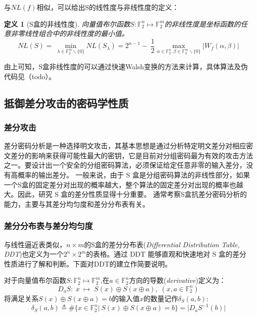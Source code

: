 \documentclass{xduugthesis}
\newtheorem{definition}{定义}
\begin{document}
与$NL(f)$相似，可以给出S的线性度与非线性度的定义：
\begin{definition}[S盒的非线性度]
    向量值布尔函数$S:\mathbb{F}_2^n \mapsto \mathbb{F}_2^m$的非线性度是坐标函数的任意非零线性组合中的非线性度的最小值。
    \begin{equation}\label{Snonlinearity}
        NL(S) = \: \mathop{min}\limits_{\lambda \in \mathbb{F}_2^m \backslash \{0\}} NL(S_{\lambda}) = 2^{n-1} - \: \frac{1}{2}\mathop{max}\limits_{\alpha \in \mathbb{F}_2^n, \beta \in \mathbb{F}_2^m \backslash \{0\}} \lvert W_f(\alpha, \beta)\rvert
    \end{equation}
\end{definition}
由上可知，S盒非线性度的可以通过快速Walsh变换\cite{sosa2016calculating}的方法来计算，具体算法及伪代码见（todo）。


\subsection{抵御差分攻击的密码学性质}
\subsubsection{差分攻击}
差分密码分析\cite{DBLP:conf/crypto/BihamS90}是一种选择明文攻击，其基本思想是通过分析特定明文差分对相应密文差分的影响来获得可能性最大的密钥，它是目前对分组密码最为有效的攻击方法之一。要设计出一个安全的分组密码算法，必须保证给定任意非零的输入差分，没有高概率的输出差分。 一般来说，由于 S 盒是分组密码算法的非线性部分，如果一个S盒的固定差分对出现的概率越大，整个算法的固定差分对出现的概率也越大。因此，研究 S 盒的差分性质显得十分重要。
通常考察S盒抗差分密码分析的能力，主要与其差分均匀度和差分分布表有关\cite{冯登国2000分组密码的设计与分析}。

\subsubsection{差分分布表与差分均匀度}
与线性逼近表类似，$n\times m$的S盒的差分分布表\cite{DBLP:conf/fse/Nyberg94}(\emph{Differential Distribution Table, DDT})也定义为一个$2^n \times 2^m$的表格。通过 DDT 能够直观和快速地对 S 盒的差分性质进行了解和判断。下面对DDT的建立作简要说明。\par
对于向量值布尔函数$S:\mathbb{F}_2^n \mapsto \mathbb{F}_2^m$,在$a\in \mathbb{F}_2^n $方向的导数(\emph{derivative})定义为：
$$
    D_aS:\; x\; \mapsto \; S(x) \oplus S(x\oplus a),\; (x,a\in \mathbb{F}_2^n)
$$
将满足关系$S(x) \oplus S(x\oplus a) =b$的输入值$x$的数量记作$\delta_S(a,b)$:
\begin{equation}
    \delta_S(a,b)\triangleq \# \{x\in \mathbb{F}_2^n |\: S(x) \oplus S(x\oplus a)=b\} = | D_aS^{-1}(b)|
\end{equation}
\end{document}
